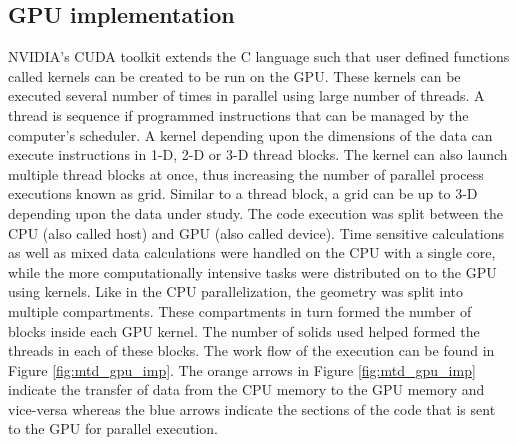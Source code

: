 \documentclass[preprint,10pt,authoryear,review]{elsarticle}
\begin{document}
\begin{linenumbers}
\subsection{GPU implementation}
NVIDIA’s CUDA toolkit extends the C language such that user defined functions 
called kernels can be created to be run on the GPU. These kernels can be 
executed several number of times in parallel using large number of threads. A thread is 
sequence if programmed instructions that can be managed by the computer’s 
scheduler. A kernel depending upon the dimensions of the data can execute 
instructions in 1-D, 2-D or 3-D thread blocks. The kernel can also launch 
multiple thread blocks at once, thus increasing the number of parallel 
process executions known as grid. Similar to a thread block, a grid can 
be up to 3-D depending upon the data under study.
The code execution was split between the CPU (also called host) and GPU 
(also called device). Time sensitive calculations as well as mixed data 
calculations were handled on the CPU with a single core, while the more 
computationally intensive tasks were distributed on to the GPU using 
kernels. Like in the CPU parallelization, the geometry was split into 
multiple compartments. These compartments in turn formed the number of 
blocks inside each GPU kernel. The number of solids used helped formed 
the threads in each of these blocks. The work flow of the execution can 
be found in Figure \ref{fig:mtd_gpu_imp}. The orange arrows in Figure 
\ref{fig:mtd_gpu_imp} indicate the 
transfer of data from the CPU memory to the GPU memory and vice-versa 
whereas the blue arrows indicate the sections of the code that is sent 
to the GPU for parallel execution.


\end{linenumbers}
\end{document}
